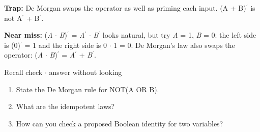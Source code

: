 \documentclass[11pt]{article}
\begin{document}
\begin{keepsection}
\begin{keepsection}
\begin{notebox}\textbf{Trap:} De Morgan swaps the operator as well as priming each input. (A + B)\ensuremath{{}^{\prime}} is not A\ensuremath{{}^{\prime}} + B\ensuremath{{}^{\prime}}.\end{notebox}

\begin{notebox}\textbf{Near miss:} (\textit{A} \ensuremath{\cdot} \textit{B})\ensuremath{{}^{\prime}} = \textit{A}\ensuremath{{}^{\prime}} \ensuremath{\cdot} \textit{B}\ensuremath{{}^{\prime}} looks natural, but try \textit{A} = 1, \textit{B} = 0: the left side is (0)\ensuremath{{}^{\prime}} = 1 and the right side is 0 \ensuremath{\cdot} 1 = 0. De Morgan’s law also swaps the operator: (\textit{A} \ensuremath{\cdot} \textit{B})\ensuremath{{}^{\prime}} = \textit{A}\ensuremath{{}^{\prime}} + \textit{B}\ensuremath{{}^{\prime}}.\end{notebox}

\begin{recallbox}{Recall check \ensuremath{\cdot} answer without looking}
\begin{enumerate}
\item State the De Morgan rule for NOT(A OR B).
\item What are the idempotent laws?
\item How can you check a proposed Boolean identity for two variables?
\end{enumerate}

\end{recallbox}
\end{keepsection}
\end{keepsection}
\end{document}
